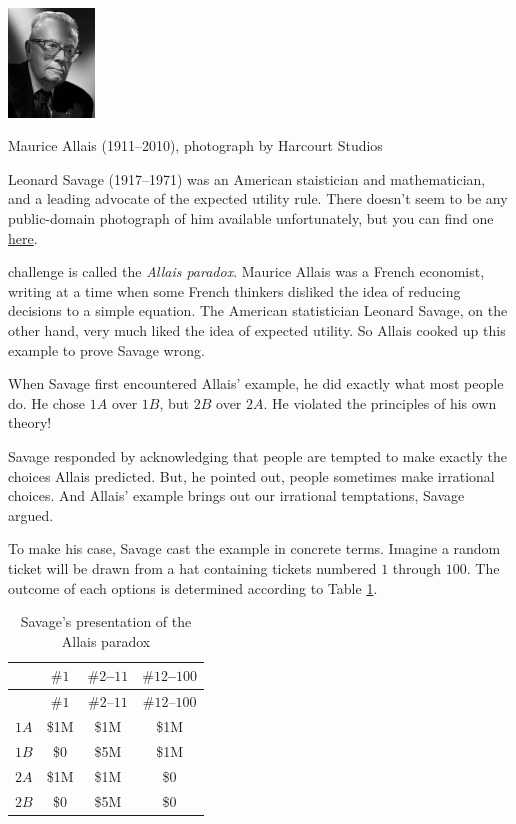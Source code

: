 \documentclass[justified]{tufte-book}
\theoremstyle{definition}
\theoremstyle{definition}
\theoremstyle{definition}
\theoremstyle{definition}
\theoremstyle{remark}
\begin{document}
\begin{marginfigure}
\includegraphics[width=0.91in]{img/allais} \caption[Maurice Allais (1911--2010), photograph by Harcourt Studios]{Maurice Allais (1911--2010), photograph by Harcourt Studios}\label{fig:unnamed-chunk-111}
\end{marginfigure}
\begin{marginfigure}
Leonard Savage (1917--1971) was an American staistician and
mathematician, and a leading advocate of the expected utility rule.
There doesn't seem to be any public-domain photograph of him available
unfortunately, but you can find one
\href{http://policonomics.com/leonard-savage/}{here}.
\end{marginfigure}

 challenge is called the \emph{Allais paradox}. Maurice Allais was a French economist, writing at a time when some French thinkers disliked the idea of reducing decisions to a simple equation. The American statistician Leonard Savage, on the other hand, very much liked the idea of expected utility. So Allais cooked up this example to prove Savage wrong.

When Savage first encountered Allais' example, he did exactly what most people do. He chose \(1A\) over \(1B\), but \(2B\) over \(2A\). He violated the principles of his own theory!

Savage responded by acknowledging that people are tempted to make exactly the choices Allais predicted. But, he pointed out, people sometimes make irrational choices. And Allais' example brings out our irrational temptations, Savage argued.

To make his case, Savage cast the example in concrete terms. Imagine a random ticket will be drawn from a hat containing tickets numbered \(1\) through \(100\). The outcome of each options is determined according to Table \ref{tab:allaishat}.

\begin{longtable}[]{@{}lccc@{}}
\caption{\label{tab:allaishat}Savage's presentation of the Allais paradox}\tabularnewline
\toprule
& \(\#1\) & \(\#2\)--\(11\) & \(\#12\)--\(100\) \\
\midrule
\endfirsthead
\toprule
& \(\#1\) & \(\#2\)--\(11\) & \(\#12\)--\(100\) \\
\midrule
\endhead
\(1A\) & \$1M & \$1M & \$1M \\
\(1B\) & \$0 & \$5M & \$1M \\
\(2A\) & \$1M & \$1M & \$0 \\
\(2B\) & \$0 & \$5M & \$0 \\
\bottomrule
\end{longtable}
\end{document}
